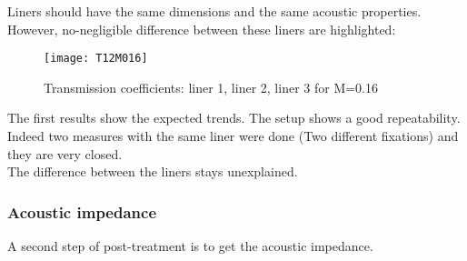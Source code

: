 Liners should have the same dimensions and the same acoustic properties. However, no-negligible difference between these liners are highlighted:
\begin{figure}[H] \centering
    \texttt{[image: T12M016]}
    \caption{Transmission coefficients: liner 1, liner 2, liner 3 for M=0.16 }
\end{figure}
The first results show the expected trends. The setup shows a good repeatability. Indeed two measures with the same liner were done (Two different fixations) and they are very closed.\\
The difference between the liners stays unexplained.
\subsubsection{Acoustic impedance}
A second step of post-treatment is to get the acoustic impedance.

\clearpage
